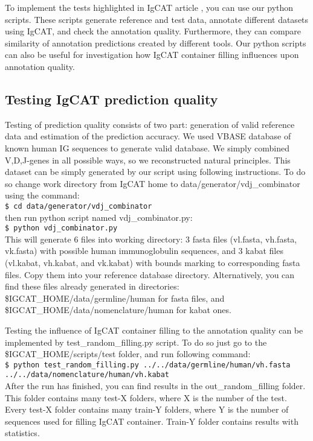 \documentclass{scrartcl}
\newcommand{\shellcmd}[1]{\\\indent\indent\texttt{\footnotesize #1}\\}
\begin{document}
{{To implement the tests highlighted in IgCAT article \cite{Yakovlev2014},
you can use our python scripts.
These scripts generate reference and test data, annotate different datasets using IgCAT,
and check the annotation quality.
Furthermore, they can compare similarity of annotation predictions
created by different tools.
Our python scripts can also be useful for investigation
how IgCAT container filling influences upon annotation quality.

\subsection{Testing IgCAT prediction quality}

Testing of prediction quality consists of two part: generation of valid reference data and 
estimation of the prediction accuracy.
We used VBASE\cite{Tomlinson1996} database of known human IG sequences
to generate valid database. We simply combined V,D,J-genes in all possible ways,
so we reconstructed natural principles.
This dataset can be simply generated by our script using following instructions.
To do so change work directory from IgCAT home to data/generator/vdj\_combinator
using the command:
\shellcmd{\$ cd data/generator/vdj\_combinator}
then run python script named vdj\_combinator.py:
\shellcmd{\$ python vdj\_combinator.py}
This will generate 6 files into working directory:
3 fasta files (vl.fasta, vh.fasta, vk.fasta)
with possible human immunoglobulin sequences,
and 3 kabat files (vl.kabat, vh.kabat, and vk.kabat)
with bounds marking to corresponding fasta files.
Copy them into your reference database directory.
Alternatively, you can find these files already generated in directories:
\$IGCAT\_HOME/data/germline/human for fasta files,
and \$IGCAT\_HOME/data/nomenclature/human for kabat ones.


Testing the influence of IgCAT container filling 
to the annotation quality can be implemented by
test\_random\_filling.py script. To do so just go to the \$IGCAT\_HOME/scripts/test
folder, and run following command:
\shellcmd{\$ python test\_random\_filling.py ../../data/germline/human/vh.fasta \\
../../data/nomenclature/human/vh.kabat}
After the run has finished, you can find results in the out\_random\_filling folder.
This folder contains many test-X folders, where X is the number of the test.
Every test-X folder contains many train-Y folders,
where Y is the number of sequences used for filling IgCAT
container. Train-Y folder contains results with statistics.

}}
\end{document}
